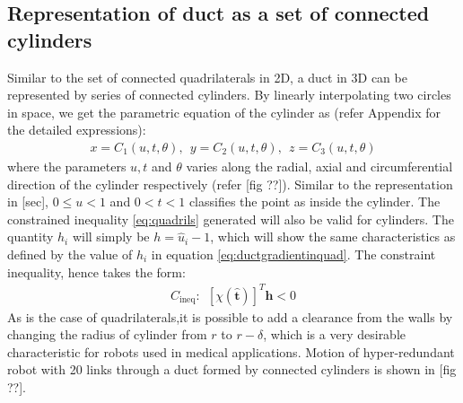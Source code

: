 \documentclass[12pt,a4]{article}
\begin{document}
\subsection{Representation of duct as a set of connected cylinders}
Similar to the set of connected quadrilaterals in 2D, a duct in 3D can be represented by series of connected cylinders. By linearly interpolating two circles in space, we get the parametric equation of the cylinder as (refer Appendix for the detailed expressions):
\begin{align}
\label{eq:cylinder}
x = C_1(u,t,\theta),~~y = C_2(u,t,\theta),~~z = C_3(u,t,\theta)
\end{align}
where the parameters $u,t$ and $\theta$ varies along the radial, axial and circumferential direction of the cylinder respectively (refer [fig ??]). Similar to the representation in [sec], $0\leq u< 1$ and $0<t<1$ classifies the point as inside the cylinder. The constrained inequality \ref{eq:quadrils} generated will also be valid for cylinders. The quantity $h_i$ will simply be $h = \hat{u}_i-1$, which will show the same characteristics as defined by the value of $h_i$ in equation \ref{eq:ductgradientinquad}. The constraint inequality, hence takes the form:
\begin{align}
\label{eq:const_cyl}
C_\text{ineq}:~~\left[\chi\left(\hat{\mathbf{t}}\right)\right]^T\mathbf{h}<0
\end{align}
As is the case of quadrilaterals,it is possible to add a clearance from the walls by changing the radius of cylinder from $r$ to $r-\delta$, which is a very desirable characteristic for robots used in medical applications. Motion of hyper-redundant robot with 20 links through a duct formed by connected cylinders is shown in [fig ??]. 
\end{document}
